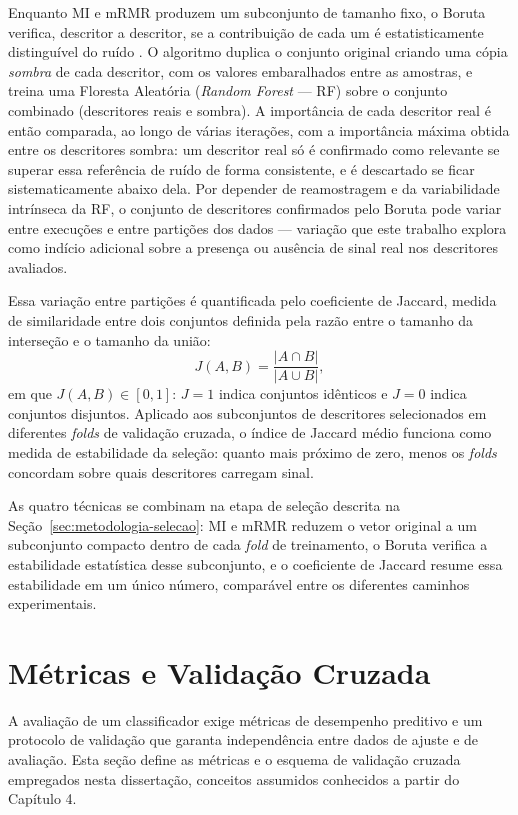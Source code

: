 Enquanto MI e mRMR produzem um subconjunto de tamanho fixo, o Boruta verifica, descritor a descritor, se a contribuição de cada um é estatisticamente distinguível do ruído \cite{kursa_boruta_2010}. O algoritmo duplica o conjunto original criando uma cópia \emph{sombra} de cada descritor, com os valores embaralhados entre as amostras, e treina uma Floresta Aleatória (\emph{Random Forest} --- RF) sobre o conjunto combinado (descritores reais e sombra). A importância de cada descritor real é então comparada, ao longo de várias iterações, com a importância máxima obtida entre os descritores sombra: um descritor real só é confirmado como relevante se superar essa referência de ruído de forma consistente, e é descartado se ficar sistematicamente abaixo dela. Por depender de reamostragem e da variabilidade intrínseca da RF, o conjunto de descritores confirmados pelo Boruta pode variar entre execuções e entre partições dos dados --- variação que este trabalho explora como indício adicional sobre a presença ou ausência de sinal real nos descritores avaliados.

Essa variação entre partições é quantificada pelo coeficiente de Jaccard, medida de similaridade entre dois conjuntos definida pela razão entre o tamanho da interseção e o tamanho da união:
\begin{equation}
J(A,B) = \frac{|A \cap B|}{|A \cup B|},
\end{equation}
em que $J(A,B) \in [0,1]$: $J=1$ indica conjuntos idênticos e $J=0$ indica conjuntos disjuntos. Aplicado aos subconjuntos de descritores selecionados em diferentes \emph{folds} de validação cruzada, o índice de Jaccard médio funciona como medida de estabilidade da seleção: quanto mais próximo de zero, menos os \emph{folds} concordam sobre quais descritores carregam sinal.

As quatro técnicas se combinam na etapa de seleção descrita na Seção~\ref{sec:metodologia-selecao}: MI e mRMR reduzem o vetor original a um subconjunto compacto dentro de cada \emph{fold} de treinamento, o Boruta verifica a estabilidade estatística desse subconjunto, e o coeficiente de Jaccard resume essa estabilidade em um único número, comparável entre os diferentes caminhos experimentais.

\section{Métricas e Validação Cruzada}

A avaliação de um classificador exige métricas de desempenho preditivo e um protocolo de validação que garanta independência entre dados de ajuste e de avaliação. Esta seção define as métricas e o esquema de validação cruzada empregados nesta dissertação, conceitos assumidos conhecidos a partir do Capítulo 4.

